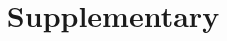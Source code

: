 \documentclass[sigconf, screen, review, anonymous]{acmart}
\begin{document}
\title{Supplementary}

% 
% 



\maketitle
%  
% 
% 
% 
% 



% 
% 


\appendix


\end{document}
